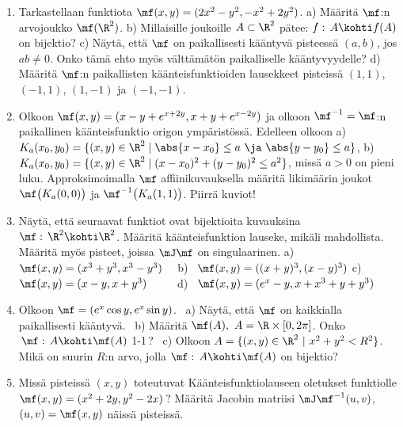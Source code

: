 \Harj
\begin{enumerate}

\item
Tarkastellaan funktiota $\mf(x,y)=(2x^2-y^2,-x^2+2y^2)$. a) Määritä $\mf$:n arvojoukko
$\mf(\R^2)$. b) Millaisille joukoille $A\subset\R^2$ pätee: $f:\,A \kohti f(A)$ on bijektio?
c) Näytä, että $\mf$ on paikallisesti kääntyvä pisteessä $(a,b)$, jos $ab \neq 0$. Onko tämä
ehto myös välttämätön paikalliselle kääntyvyydelle? d) Määritä $\mf$:n paikallisten
käänteisfunktioiden lausekkeet pisteissä $(1,1)$, $(-1,1)$, $(1,-1)$ ja $(-1,-1)$.

\item
Olkoon $\mf(x,y)=(x-y+e^{x+2y},x+y+e^{x-2y})$ ja olkoon $\mf^{-1}=\mf$:n paikallinen 
käänteisfunktio origon ympäristössä. Edelleen olkoon \vspace{1mm}\newline
a) \ $K_a(x_0,y_0)=\{(x,y)\in\R^2 \mid \abs{x-x_0} \le a\ \ja\ \abs{y-y_0} \le a\}$, \newline
b) \ $K_a(x_0,y_0)=\{(x,y)\in\R^2 \mid (x-x_0)^2+(y-y_0)^2 \le a^2\}$, \vspace{1mm}\newline
missä $a>0$ on pieni luku. Approksimoimalla $\mf$ affiinikuvauksella määritä likimäärin joukot
$\mf\bigl(K_a(0,0)\bigr)$ ja $\mf^{-1}\bigl(K_a(1,1)\bigr)$. Piirrä kuviot!

\item
Näytä, että seuraavat funktiot ovat bijektioita kuvauksina $\mf:\,\R^2\kohti\R^2$. Määritä
käänteisfunktion lauseke, mikäli mahdollista. Määritä myös pisteet, joissa $\mJ\mf$ on 
singulaarinen. \vspace{1mm}\newline
a) \ $\mf(x,y)=(x^3+y^3,x^3-y^3) \quad$ 
b) \ $\mf(x,y)=((x+y)^3,(x-y)^3)$ \newline
c) \ $\mf(x,y)=(x-y,x+y^3) \qquad\ $
d) \ $\mf(x,y)=(e^x-y,x+x^3+y+y^3)$

\item
Olkoon $\mf=(e^x\cos y,e^x\sin y)$. \ a) Näytä, että $\mf$ on kaikkialla paikallisesti 
kääntyvä. \ b) Määritä $\mf(A),\ A=\R\times[0,2\pi]$. Onko $\,\mf:\,A\kohti\mf(A)$ 1-1\,? \
\linebreak c) Olkoon $A=\{(x,y)\in\R^2 \ | \ x^2+y^2<R^2\}$. Mikä on suurin $R$:n arvo, jolla
$\mf:\,A\kohti\mf(A)$ on bijektio?

\item
Missä pisteissä $(x,y)$ toteutuvat Käänteisfunktiolauseen oletukset funktiolle
$\mf(x,y)=(x^2+2y,y^2-2x)$\,? Määritä Jacobin matriisi $\mJ\mf^{-1}(u,v)$, $(u,v)=\mf(x,y)$
näissä pisteissä.


\end{enumerate}
